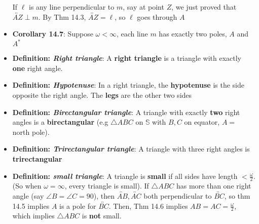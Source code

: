 \documentclass{report}
\begin{document}
\begin{itemize}
            \bigbreak \noindent 
            If $\ell$ is any line perpendicular to $m$, say at point $Z$, we just proved that $ \overleftrightarrow{AZ} \perp m$. By Thm 14.3, $\overleftrightarrow{AZ} = \ell$, so $\ell$ goes through $A$ \endpf
        \item \textbf{Corollary 14.7}: Suppose $\omega < \infty$, each line $m$ has exactly two poles, $A$ and $A^{*}$
        \item \textbf{Definition: \textit{Right triangle}}: A \textbf{right triangle} is a triangle with exactly \textbf{one} right angle.
        \item \textbf{Definition: \textit{Hypotenuse}}: In a right triangle, the \textbf{hypotenuse} is the side opposite the right angle. The \textbf{legs} are the other two sides
        \item \textbf{Definition: \textit{Birectangular triangle}}: A triangle with exactly \textbf{two} right angles is a \textbf{birectangular} (e.g $\triangle ABC$ on $\mathbb{S}$ with $B,C$ on equator, $A = $ north pole). 
        \item \textbf{Definition: \textit{Trirectangular triangle}}: A triangle with three right angles is \textbf{trirectangular}
        \item \textbf{Definition: \textit{small triangle}}: A triangle is \textbf{small} if all sides have length $< \frac{\omega}{2}$. (So when $\omega = \infty$, every triangle is small).
            \bigbreak \noindent 
            If $\triangle ABC$ has more than one right angle (say $\angle B = \angle C = 90$), then $ \overleftrightarrow{AB}, \overleftrightarrow{AC}$ both perpendicular to $ \overleftrightarrow{BC}$, so thm 14.5 implies $A$ is a pole for $\overleftrightarrow{BC}$. Then, Thm 14.6 implies $AB = AC = \frac{\omega}{2}$, which implies $\triangle ABC$ is \textbf{not} small.
    \end{itemize}

    \pagebreak 
\end{document}

